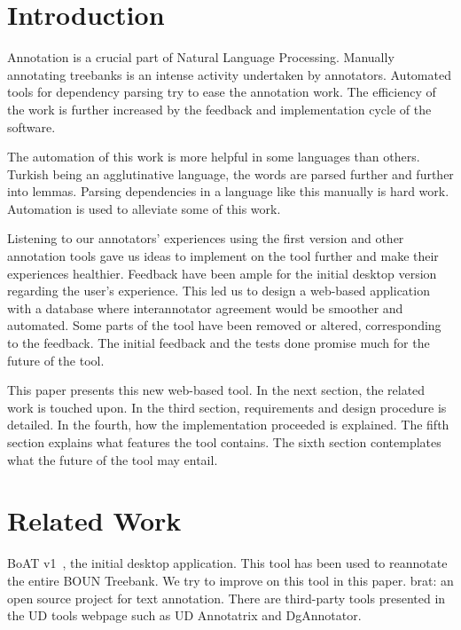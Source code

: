 \documentclass[
]{ceurart}
\begin{document}
\section{Introduction}

Annotation is a crucial part of Natural Language Processing.
Manually annotating treebanks is an intense activity undertaken by annotators.
Automated tools for dependency parsing try to ease the annotation work.
The efficiency of the work is further increased by the feedback and implementation cycle of the software.

The automation of this work is more helpful in some languages than others.
Turkish being an agglutinative language, the words are parsed further and further into lemmas.
Parsing dependencies in a language like this manually is hard work.
Automation is used to alleviate some of this work.

Listening to our annotators' experiences using the first version and other annotation tools gave us ideas to implement on the tool further and make their experiences healthier.
Feedback have been ample for the initial desktop version regarding the user's experience.
This led us to design a web-based application with a database where interannotator agreement would be smoother and automated.
Some parts of the tool have been removed or altered, corresponding to the feedback.
The initial feedback and the tests done promise much for the future of the tool.

This paper presents this new web-based tool.
In the next section, the related work is touched upon.
In the third section, requirements and design procedure is detailed.
In the fourth, how the implementation proceeded is explained.
The fifth section explains what features the tool contains.
The sixth section contemplates what the future of the tool may entail.

\section{Related Work}

BoAT v1~\cite{turk-etal-2019-turkish}, the initial desktop application. 
This tool has been used to reannotate the entire BOUN Treebank.
We try to improve on this tool in this paper.\newline
brat: an open source project for text annotation.\cite{brat}\newline
There are third-party tools presented in the UD tools webpage such as UD Annotatrix\cite{tyers-etal:2018} and DgAnnotator\cite{dgannotator}.
\end{document}
